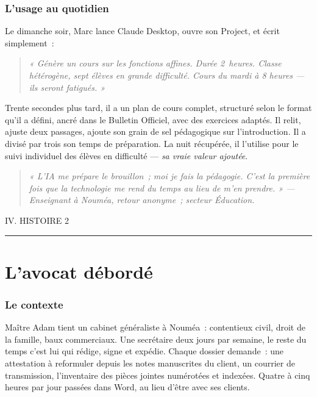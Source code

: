 \documentclass[11pt,a4paper]{article}
\newcommand{\dateline}[1]{{\footnotesize\ttfamily\color{encrefaint}\MakeUppercase{#1}}}
\newcommand{\bordsec}[1]{\subsubsection*{\textcolor{bordeaux}{#1}}}
\newcommand{\pullquote}[1]{%
  \begin{quote}\itshape\color{encre}\large #1\end{quote}%
}
\begin{document}
\bordsec{L'usage au quotidien}

Le dimanche soir, Marc lance Claude Desktop, ouvre son Project, et écrit
simplement~:

\begin{quote}\itshape
« Génère un cours sur les fonctions affines. Durée 2~heures. Classe
hétérogène, sept élèves en grande difficulté. Cours du mardi à 8 heures —
ils seront fatigués. »
\end{quote}

Trente secondes plus tard, il a un plan de cours complet, structuré selon
le format qu'il a défini, ancré dans le Bulletin Officiel, avec des
exercices adaptés. Il relit, ajuste deux passages, ajoute son grain de sel
pédagogique sur l'introduction. Il a divisé par trois son temps de
préparation. La nuit récupérée, il l'utilise pour le suivi individuel
des élèves en difficulté — \textit{sa vraie valeur ajoutée}.

\pullquote{« L'IA me prépare le brouillon~; moi je fais la pédagogie.
C'est la première fois que la technologie me rend du temps au lieu de
m'en prendre. » \footnotesize\rmfamily\color{encrefaint} — Enseignant à Nouméa, retour anonyme~; secteur Éducation.}

\newpage


\dateline{IV. \quad Histoire 2}

\vspace{0.4cm}
{\color{encre}\rule{\linewidth}{0.4pt}}
\vspace{1cm}

\section*{L'avocat débordé}

\subsubsection*{Le contexte}

Maître Adam tient un cabinet généraliste à Nouméa~: contentieux civil,
droit de la famille, baux commerciaux. Une secrétaire deux jours par semaine,
le reste du temps c'est lui qui rédige, signe et expédie. Chaque dossier
demande~: une attestation à reformuler depuis les notes manuscrites du
client, un courrier de transmission, l'inventaire des pièces jointes
numérotées et indexées. Quatre à cinq heures par jour passées dans Word,
au lieu d'être avec ses clients.
\end{document}
